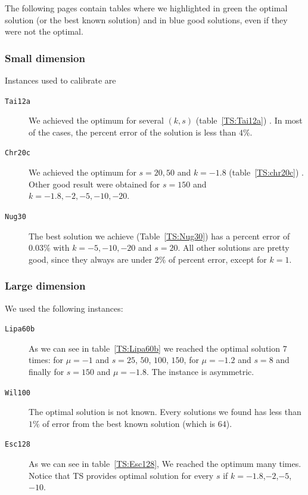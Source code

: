 The following pages contain tables where we highlighted in \colorbox{green!40}{green} the optimal solution (or the best known solution) and  in \colorbox{blue!30}{blue} good solutions, even if they were not the optimal.


\subsubsection{Small dimension}
Instances used to calibrate are 
\begin{description}
	\item[\texttt{Tai12a}] We achieved the optimum for several $(k,s)$ (table~\ref{TS:Tai12a})
	. In  most of the cases, the percent error of the solution is less than $4\%$.
	\item[\texttt{Chr20c}] We achieved the optimum for $s = 20,50$ and $k = -1.8$ (table~\ref{TS:chr20c})
	. Other good result were obtained  for  $s = 150$ and $k = -1.8, -2, -5, -10, -20$.
	\item[\texttt{Nug30}] The best solution we achieve (Table~\ref{TS:Nug30}) 
	has a percent error of  $0.03\%$  with $k = -5, -10, -20$ and $s = 20$. All other solutions are pretty good, since they always are under $2\%$ of percent error, except for $k = 1$.
\end{description}




\subsubsection{Large dimension}
We used the following instances:



\begin{description}
	\item[\texttt{Lipa60b}] As we can see in table~\ref{TS:Lipa60b} 
we reached the optimal solution $7$ times: for $\mu = -1$ and $s= 25$, $ 50$, $100$, $150$, for  $\mu = -1.2$ and $s = 8$ and finally for $s = 150$ and $\mu = -1.8$. The instance is asymmetric.
	\item[\texttt{Wil100}]The optimal solution is not known. Every solutions we found has less than $1\%$ of error from the best known solution (which is $64$).
	\item[\texttt{Esc128}] As we can see in table~\ref{TS:Esc128}, 
	We reached the optimum many times. Notice that TS provides optimal solution for every $s$ if $k=-1.8$,$-2$,$-5$,$-10$.

\end{description}

